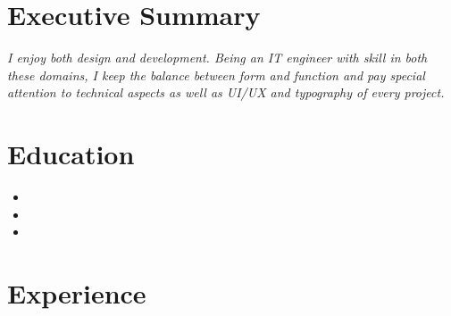 \documentclass[10.1pt,a4paper,sans]{moderncv}        %
\begin{document}
\makecvtitle
\vspace{-30pt}
\section{Executive Summary}

\vspace{3pt}

\textit{\small{I enjoy both design and development. Being an IT engineer with skill in both these domains, I keep the balance between form and function and pay special attention to technical aspects as well as UI/UX and typography of every project.}}

\section{Education}

\vspace{3pt}

\begin{itemize}

\item{}

\item{}  %

\item{}

\end{itemize}

\section{Experience}

\vspace{3pt}
\end{document}
